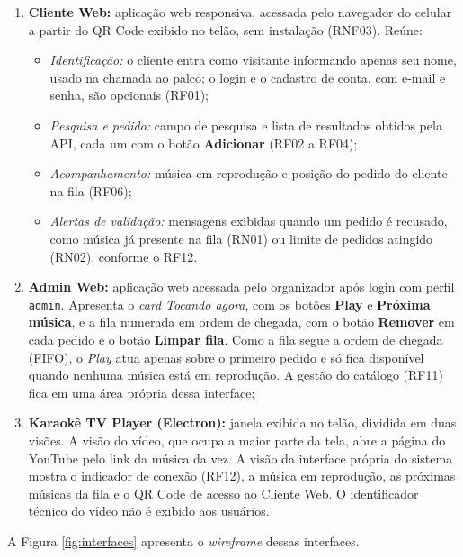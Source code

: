 \begin{enumerate}
  \item \textbf{Cliente Web:} aplicação web responsiva, acessada pelo navegador do celular a partir do QR Code exibido no telão, sem instalação (RNF03). Reúne:
    \begin{itemize}
      \item \textit{Identificação:} o cliente entra como visitante informando apenas seu nome, usado na chamada ao palco; o login e o cadastro de conta, com e-mail e senha, são opcionais (RF01);
      \item \textit{Pesquisa e pedido:} campo de pesquisa e lista de resultados obtidos pela API, cada um com o botão \textbf{Adicionar} (RF02 a RF04);
      \item \textit{Acompanhamento:} música em reprodução e posição do pedido do cliente na fila (RF06);
      \item \textit{Alertas de validação:} mensagens exibidas quando um pedido é recusado, como música já presente na fila (RN01) ou limite de pedidos atingido (RN02), conforme o RF12.
    \end{itemize}
  \item \textbf{Admin Web:} aplicação web acessada pelo organizador após login com perfil \texttt{admin}. Apresenta o \textit{card} \textit{Tocando agora}, com os botões \textbf{Play} e \textbf{Próxima música}, e a fila numerada em ordem de chegada, com o botão \textbf{Remover} em cada pedido e o botão \textbf{Limpar fila}. Como a fila segue a ordem de chegada (FIFO), o \textit{Play} atua apenas sobre o primeiro pedido e só fica disponível quando nenhuma música está em reprodução. A gestão do catálogo (RF11) fica em uma área própria dessa interface;
  \item \textbf{Karaokê TV Player (Electron):} janela exibida no telão, dividida em duas visões. A visão do vídeo, que ocupa a maior parte da tela, abre a página do YouTube pelo link da música da vez. A visão da interface própria do sistema mostra o indicador de conexão (RF12), a música em reprodução, as próximas músicas da fila e o QR Code de acesso ao Cliente Web. O identificador técnico do vídeo não é exibido aos usuários.
\end{enumerate}

A Figura \ref{fig:interfaces} apresenta o \textit{wireframe} dessas interfaces.

